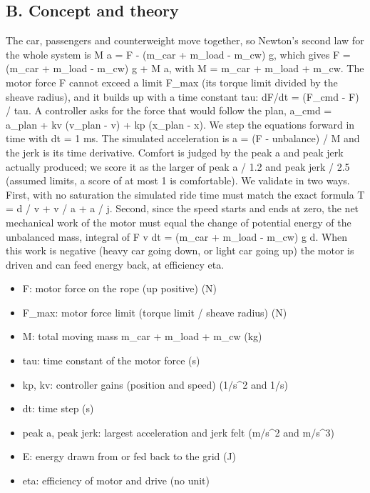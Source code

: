 \documentclass[11pt,a4paper]{article}
\begin{document}
\subsection*{B. Concept and theory}
The car, passengers and counterweight move together, so Newton's second law for the whole system is M a = F - (m\_car + m\_load - m\_cw) g, which gives F = (m\_car + m\_load - m\_cw) g + M a, with M = m\_car + m\_load + m\_cw. The motor force F cannot exceed a limit F\_max (its torque limit divided by the sheave radius), and it builds up with a time constant tau: dF/dt = (F\_cmd - F) / tau. A controller asks for the force that would follow the plan, a\_cmd = a\_plan + kv (v\_plan - v) + kp (x\_plan - x). We step the equations forward in time with dt = 1 ms. The simulated acceleration is a = (F - unbalance) / M and the jerk is its time derivative. Comfort is judged by the peak \textbar{}a\textbar{} and peak \textbar{}jerk\textbar{} actually produced; we score it as the larger of peak a / 1.2 and peak jerk / 2.5 (assumed limits, a score of at most 1 is comfortable). We validate in two ways. First, with no saturation the simulated ride time must match the exact formula T = d / v + v / a + a / j. Second, since the speed starts and ends at zero, the net mechanical work of the motor must equal the change of potential energy of the unbalanced mass, integral of F v dt = (m\_car + m\_load - m\_cw) g d. When this work is negative (heavy car going down, or light car going up) the motor is driven and can feed energy back, at efficiency eta.

\begin{itemize}[nosep]
\item F: motor force on the rope (up positive) (N)
\item F\_max: motor force limit (torque limit / sheave radius) (N)
\item M: total moving mass m\_car + m\_load + m\_cw (kg)
\item tau: time constant of the motor force (s)
\item kp, kv: controller gains (position and speed) (1/s\textasciicircum{}2 and 1/s)
\item dt: time step (s)
\item peak a, peak jerk: largest acceleration and jerk felt (m/s\textasciicircum{}2 and m/s\textasciicircum{}3)
\item E: energy drawn from or fed back to the grid (J)
\item eta: efficiency of motor and drive (no unit)
\end{itemize}
\end{document}
